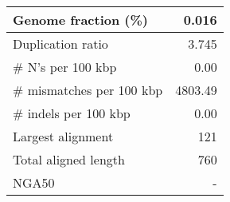 \documentclass[12pt,a4paper]{article}
\begin{document}
\begin{table}[ht]
\begin{center}
\begin{tabular}{|l*{1}{|r}|}
Genome fraction (\%) & 0.016 \\ \hline
Duplication ratio & 3.745 \\ \hline
\# N's per 100 kbp & 0.00 \\ \hline
\# mismatches per 100 kbp & 4803.49 \\ \hline
\# indels per 100 kbp & 0.00 \\ \hline
Largest alignment & 121 \\ \hline
Total aligned length & 760 \\ \hline
NGA50 & - \\ \hline
\end{tabular}
\end{center}
\end{table}
\end{document}
